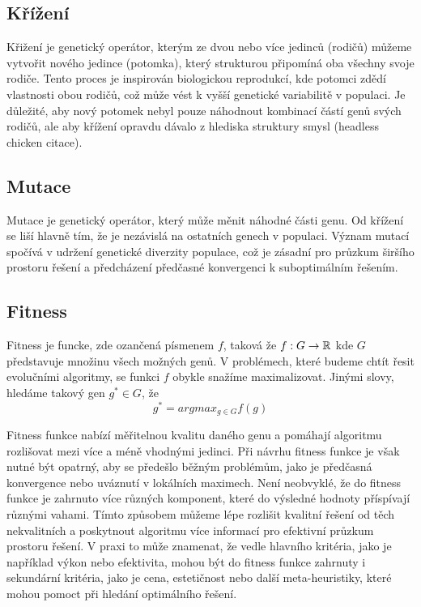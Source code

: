 \subsection{Křížení}
Křižení je genetický operátor, kterým ze dvou nebo více jedinců (rodičů) můžeme vytvořit nového jedince (potomka), který strukturou připomíná oba všechny svoje rodiče. Tento proces je inspirován biologickou reprodukcí, kde potomci zdědí vlastnosti obou rodičů, což může vést k vyšší genetické variabilitě v populaci. Je důležité, aby nový potomek nebyl pouze náhodnout kombinací částí genů svých rodičů, ale aby křížení opravdu dávalo z hlediska struktury smysl (headless chicken citace).

\subsection{Mutace}
Mutace je genetický operátor, který může měnit náhodné části genu. Od křížení se liší hlavně tím, že je nezávislá na ostatních genech v populaci. Význam mutací spočívá v udržení genetické diverzity populace, což je zásadní pro průzkum širšího prostoru řešení a předcházení předčasné konvergenci k suboptimálním řešením.

\subsection{Fitness}
Fitness je funcke, zde ozančená písmenem $f$, taková že $f: G \rightarrow \mathbb{R}$ kde $G$ představuje množinu všech možných genů. V problémech, které budeme chtít řesit evolučními algoritmy, se funkci $f$ obykle snažíme maximalizovat. Jinými slovy, hledáme takový gen $g^* \in G$, že 
$$g^* = argmax_{g \in G} f(g)$$

Fitness funkce nabízí měřitelnou kvalitu daného genu a pomáhají algoritmu rozlišovat mezi více a méně vhodnými jedinci. Při návrhu fitness funkce je však nutné být opatrný, aby se předešlo běžným problémům, jako je předčasná konvergence nebo uváznutí v lokálních maximech. Není neobvyklé, že do fitness funkce je zahrnuto více různých komponent, které do výsledné hodnoty příspívají různými vahami. Tímto způsobem můžeme lépe rozlišit kvalitní řešení od těch nekvalitních a poskytnout algoritmu více informací pro efektivní průzkum prostoru řešení. V praxi to může znamenat, že vedle hlavního kritéria, jako je například výkon nebo efektivita, mohou být do fitness funkce zahrnuty i sekundární kritéria, jako je cena, estetičnost nebo další meta-heuristiky, které mohou pomoct při hledání optimálního řešení.

